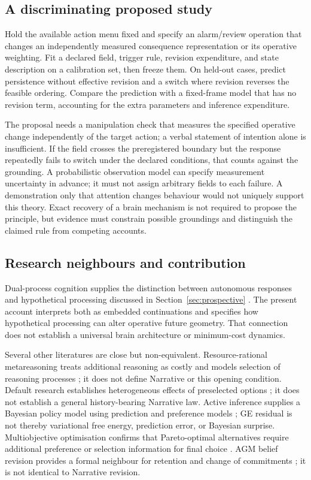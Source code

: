 \documentclass[11pt,a4paper]{article}
\theoremstyle{remark}
\begin{document}
\subsection{A discriminating proposed study}

Hold the available action menu fixed and specify an alarm/review operation
that changes an independently measured consequence representation or its
operative weighting. Fit a declared field, trigger rule, revision expenditure,
and state description on a calibration set, then freeze them. On held-out
cases, predict persistence without effective revision and a switch where
revision reverses the feasible ordering. Compare the prediction with a
fixed-frame model that has no revision term, accounting for the extra
parameters and inference expenditure.

The proposal needs a manipulation check that measures the specified operative
change independently of the target action; a verbal statement of intention
alone is insufficient. If the field crosses the preregistered boundary but
the response repeatedly fails to switch under the declared conditions, that
counts against the grounding. A probabilistic observation model can specify
measurement uncertainty in advance; it must not assign arbitrary fields to
each failure. A demonstration only that attention changes behaviour would
not uniquely support this theory. Exact recovery of a brain mechanism is
not required to propose the principle, but evidence must constrain possible
groundings and distinguish the claimed rule from competing accounts.

\subsection{Research neighbours and contribution}

Dual-process cognition supplies the distinction between autonomous responses
and hypothetical processing discussed in Section~\ref{sec:prospective}
\citep{evansstanovich2013}. The present account interprets both as embedded
continuations and specifies how hypothetical processing can alter operative
future geometry. That connection does not establish a universal brain
architecture or minimum-cost dynamics.

Several other literatures are close but non-equivalent. Resource-rational
metareasoning treats additional reasoning as costly and models selection of
reasoning processes \citep{godara2024}; it does not define Narrative or this
opening condition. Default research establishes heterogeneous effects of
preselected options \citep{jachimowicz2019}; it does not establish a general
history-bearing Narrative law. Active inference supplies a Bayesian policy model
using prediction and preference models \citep{dacosta2024}; GE residual is not
thereby variational free energy, prediction error, or Bayesian surprise.
Multiobjective optimisation confirms that Pareto-optimal alternatives require
additional preference or selection information for final choice
\citep{pajasmaa2025}. AGM belief revision provides a formal neighbour for
retention and change of commitments \citep{agm1985}; it is not identical to
Narrative revision.
\end{document}
